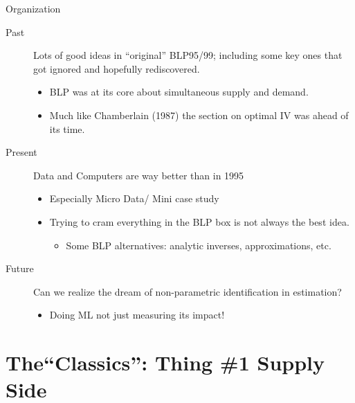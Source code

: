 \begin{frame}{Organization}
    \begin{description}
        \item[Past] Lots of good ideas in ``original'' BLP95/99; including some key ones that got ignored and hopefully rediscovered.
        \begin{itemize}
            \item BLP was at its core about \alert{simultaneous supply and demand}.
            \item Much like Chamberlain (1987) the section on optimal IV was ahead of its time.
        \end{itemize}
        \item[Present] Data and Computers are way better than in 1995
        \begin{itemize}
            \item Especially \alert{Micro Data}/ Mini case study
            \item Trying to cram everything in the BLP box is not always the best idea. 
            \begin{itemize}
                \item Some BLP alternatives: analytic inverses, approximations, etc.
            \end{itemize}
        \end{itemize}
        \item[Future] Can we realize the dream of \alert{non-parametric identification} in \alert{estimation}?
            \begin{itemize}
                \item Doing ML not just measuring its impact!
            \end{itemize}
    \end{description}
\end{frame}


\section*{The``Classics'': Thing \#1 Supply Side}

